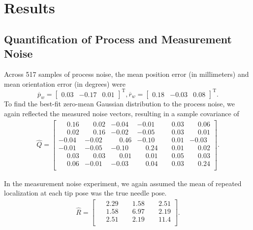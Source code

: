 \section{Results}
\label{sec:HumanInTheLoopResults}

\subsection{Quantification of Process and Measurement Noise}
Across 517 samples of process noise, the mean position error (in millimeters) and mean orientation error (in degrees) were \[{\overline{p}_{w}} = \begin{bmatrix} 0.03 &-0.17 &0.01 \end{bmatrix}^{\text{T}}, {\overline{r}_{w}} = \begin{bmatrix} 0.18 &-0.03 &0.08 \end{bmatrix}^{\text{T}}.\] To find the best-fit zero-mean Gaussian distribution to the process noise, we again reflected the measured noise vectors, resulting in a sample covariance of
\begin{align*}
{\hat{Q}} = \begin{bmatrix} 
\phantom{-}0.16 & \phantom{-}0.02 	&-0.04 & -0.01 & \phantom{-}0.03 & \phantom{-}0.06\\
\phantom{-}0.02 & \phantom{-}0.16 & -0.02 & -0.05 & \phantom{-}0.03 & \phantom{-}0.01 \\ 
-0.04 & -0.02 & \phantom{-}0.46 & -0.10 & \phantom{-}0.01 & -0.03 \\
-0.01 & -0.05 & -0.10 & \phantom{-}0.24 & \phantom{-}0.01 & \phantom{-}0.02 \\
\phantom{-}0.03 & \phantom{-}0.03 & \phantom{-}0.01 & \phantom{-}0.01 & \phantom{-}0.05 & \phantom{-}0.03 \\
\phantom{-}0.06 & -0.01 & -0.03 & \phantom{-}0.04 & \phantom{-}0.03 & \phantom{-}0.24\\ 
\end{bmatrix}.
\end{align*}

In the measurement noise experiment, we again assumed the mean of repeated localization at each tip pose was the true needle pose.
\begin{align*}
{\hat{R}} = \begin{bmatrix} 
\phantom{-}2.29 & \phantom{-}1.58 & \phantom{-}2.51 \\ 
\phantom{-}1.58 & \phantom{-}6.97 & \phantom{-}2.19 \\ 
\phantom{-}2.51 & \phantom{-}2.19 & \phantom{-}11.4 \\ 
\end{bmatrix}.
\end{align*}

